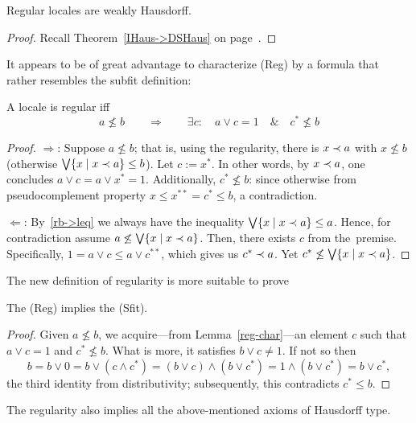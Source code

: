 \begin{cor}
  Regular locales are weakly Hausdorff.
\end{cor}
\begin{proof}
  Recall Theorem~\ref{IHaus->DSHaus} on page~\pageref{IHaus->DSHaus}\thinspace.
\end{proof}

It appears to be of great advantage to characterize (Reg) by a formula
that rather resembles the subfit definition:
\begin{lem} \label{reg-char}
  A locale is regular iff
  \[
    a \not\le b \qquad \Rightarrow \qquad \exists c: \quad a \vee c = 1 \quad
    \& \quad c^* \not\leq b
  \]
\end{lem}
\begin{proof}
  $\Rightarrow$:
  Suppose $a \not\le b$;
  that is, using the regularity, there is $x \prec a$ with $x \not\le b$ (otherwise
  $\bigvee \{x \mid x \prec a\} \le b$).
  Let $c := x^*$.
  In other words, by $x \prec a$, one concludes $a \vee c = a \vee x^* = 1$.
  Additionally, $c^* \not\le b$: since otherwise from pseudocomplement property
  $x \le x^{**} = c^* \le b$, a contradiction.

  $\Leftarrow$:
  By~\ref{rb->leq} we always have the inequality $\bigvee \{x \mid x \prec a\} \le
  a$.
  Hence, for contradiction assume $a \not\le \bigvee \{x \mid x \prec a\}$.
  Then, there exists $c$ from the~premise.
  Specifically, $1 = a \vee c \le a \vee c^{**}$, which gives us $c^* \prec a$.
  Yet $c^* \not\le \bigvee \{x \mid x \prec a\}$.
\end{proof}

The new definition of regularity is more suitable to prove
\begin{thm}
  The (Reg) implies the (Sfit).
\end{thm}
\begin{proof}
  Given $a \not\le b$, we acquire---from Lemma~\ref{reg-char}\thinspace---an
  element $c$ such that $a \vee c = 1$ and $c^* \not\le b$.
  What is more, it satisfies $b \vee c \ne 1$.
  If not so then
  \[
    b = b \vee 0 = b \vee (c \wedge c^*) = (b \vee c) \wedge (b \vee c^*) = 1
    \wedge (b \vee c^*) = b \vee c^*,
  \]
  the third identity from distributivity; subsequently, this contradicts $c^*
  \le b$.
\end{proof}

\begin{cor}
  The regularity also implies all the above-mentioned axioms of Hausdorff type.
\end{cor}
